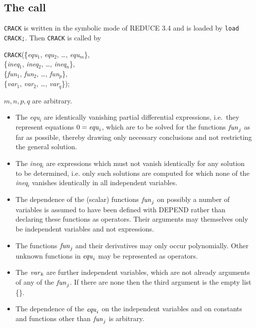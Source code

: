 \subsection{The call}
{\tt CRACK} is written in the symbolic mode of REDUCE 3.4 and is loaded by
{\tt load CRACK;}. Then {\tt CRACK} is called by
\begin{tabbing}
  {\tt CRACK}(\=\{{\it equ}$_1$, {\it equ}$_2$, \ldots , {\it equ}$_m$\},  \\
              \>\{{\it ineq}$_1$, {\it ineq}$_2$, \ldots , {\it ineq}$_n$\}, \\
              \>\{{\it fun}$_1$, {\it fun}$_2$, \ldots , {\it fun}$_p$\},  \\
              \>\{{\it var}$_1$, {\it var}$_2$, \ldots , {\it var}$_q$\});
\end{tabbing}
        $m,n,p,q$ are arbitrary.
\begin{itemize}
\item
The {\it equ}$_i$ are identically vanishing partial differential expressions,
i.e.\
they represent equations  $0 = {\it equ}_i$, which are to be solved for the
functions ${\it fun}_j$ as far as possible, thereby drawing only necessary
conclusions and not restricting the general solution.
\item
The {\it ineq}$_i$ are expressions which must not vanish identically for
any solution to be determined, i.e. only such solutions are computed for which
none of the {\it ineq}$_i$ vanishes identically in all independent variables.
\item
The dependence of the (scalar) functions ${\it fun}_j$ on possibly a number of
variables is assumed to have been defined with DEPEND rather than
declaring these functions
as operators. Their arguments may  themselves only be independent variables
and not expressions.
\item
The functions ${\it fun}_j$ and their derivatives may only occur polynomially.
Other unknown functions in ${\it equ}_i$ may be represented as operators.
\item
The ${\it var}_k$ are further independent variables, which are not
already arguments
of any of the ${\it fun}_j$. If there are none then the third argument is
the empty list \{\}.
\item
The dependence of the ${\it equ}_i$ on the independent variables and on
constants and functions other than ${\it fun}_j$ is arbitrary.
\end{itemize}

